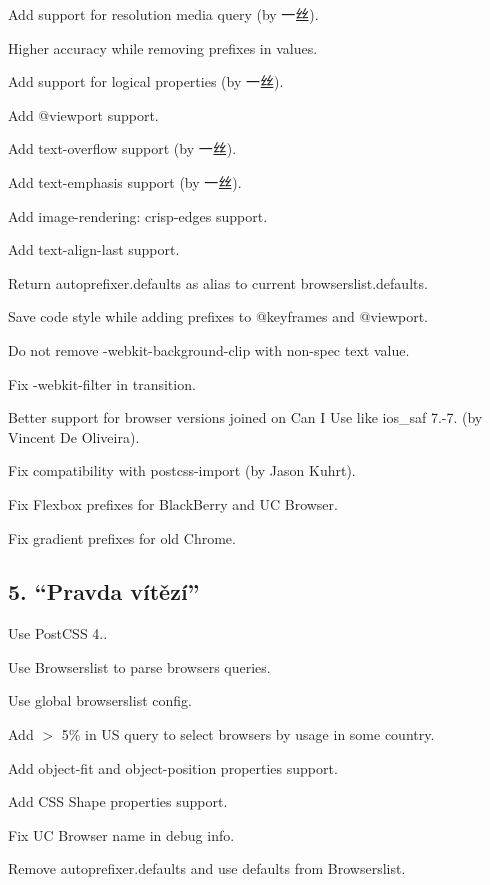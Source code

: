\begin{DoxyItemize}
\item Add support for resolution media query (by 一丝).
\item Higher accuracy while removing prefixes in values.
\item Add support for logical properties (by 一丝).
\item Add {\ttfamily @viewport} support.
\item Add {\ttfamily text-\/overflow} support (by 一丝).
\item Add {\ttfamily text-\/emphasis} support (by 一丝).
\item Add {\ttfamily image-\/rendering\+: crisp-\/edges} support.
\item Add {\ttfamily text-\/align-\/last} support.
\item Return {\ttfamily autoprefixer.\+defaults} as alias to current {\ttfamily browserslist.\+defaults}.
\item Save code style while adding prefixes to {\ttfamily @keyframes} and {\ttfamily @viewport}.
\item Do not remove {\ttfamily -\/webkit-\/background-\/clip} with non-\/spec {\ttfamily text} value.
\item Fix {\ttfamily -\/webkit-\/filter} in {\ttfamily transition}.
\item Better support for browser versions joined on Can I Use like {\ttfamily ios\+\_\+saf 7.-\/7.} (by Vincent De Oliveira).
\item Fix compatibility with {\ttfamily postcss-\/import} (by Jason Kuhrt).
\item Fix Flexbox prefixes for Black\+Berry and UC Browser.
\item Fix gradient prefixes for old Chrome.
\end{DoxyItemize}

\subsection*{5. “\+Pravda vítězí”}


\begin{DoxyItemize}
\item Use Post\+C\+SS 4..
\item Use Browserslist to parse browsers queries.
\item Use global {\ttfamily browserslist} config.
\item Add {\ttfamily $>$ 5\% in US} query to select browsers by usage in some country.
\item Add {\ttfamily object-\/fit} and {\ttfamily object-\/position} properties support.
\item Add C\+SS Shape properties support.
\item Fix UC Browser name in debug info.
\item Remove {\ttfamily autoprefixer.\+defaults} and use defaults from Browserslist.
\end{DoxyItemize}

